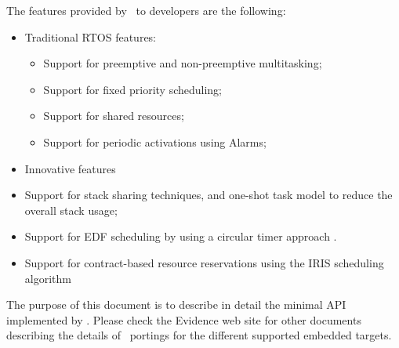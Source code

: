 The features provided by \ee\ to developers are the following:
\begin{itemize}
\item Traditional RTOS features:
  \begin{itemize}
  \item Support for preemptive and non-preemptive multitasking;
  \item Support for fixed priority scheduling;
  \item Support for shared resources;
  \item Support for periodic activations using Alarms;
  \end{itemize}
\item Innovative features
  \item Support for stack sharing techniques, and one-shot task
    model to reduce the overall stack usage;
  \item Support for EDF scheduling by using a circular timer approach
    \cite{Carlini03}.
  \item Support for contract-based resource reservations using the
    IRIS scheduling algorithm \cite{iris}
\end{itemize}

The purpose of this document is to describe in detail the minimal API
implemented by \ee. Please check the Evidence web site for other
documents describing the details of \ee\ portings for the different
supported embedded targets.
